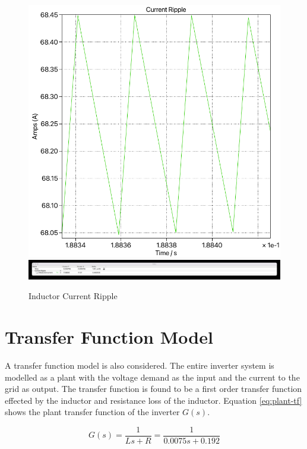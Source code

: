 \documentclass[12pt]{article}
\begin{document}
\begin{figure}[ht]
    \centering{}
    \includegraphics[width=\textwidth, height=0.4\textheight, keepaspectratio]{img/Switching Current Ripple.pdf}
    \includegraphics[width=\textwidth, height=0.4\textheight, keepaspectratio]{img/Switching Current Ripple Cursor.jpg}
    \caption{Inductor Current Ripple}
    \label{fig:switching-current-ripple}
\end{figure}

\section{Transfer Function Model}

A transfer function model is also considered.
The entire inverter system is modelled as a plant with the voltage demand as the input and the current to the grid as output.
The transfer function is found to be a first order transfer function effected by the inductor and resistance loss of the inductor.
Equation \ref{eq:plant-tf} shows the plant transfer function of the inverter $G(s)$.

\begin{equation} \label{eq:plant-tf}
    G(s) = \frac{1}{Ls + R} = \frac{1}{0.0075 s + 0.192}
\end{equation}
\end{document}
